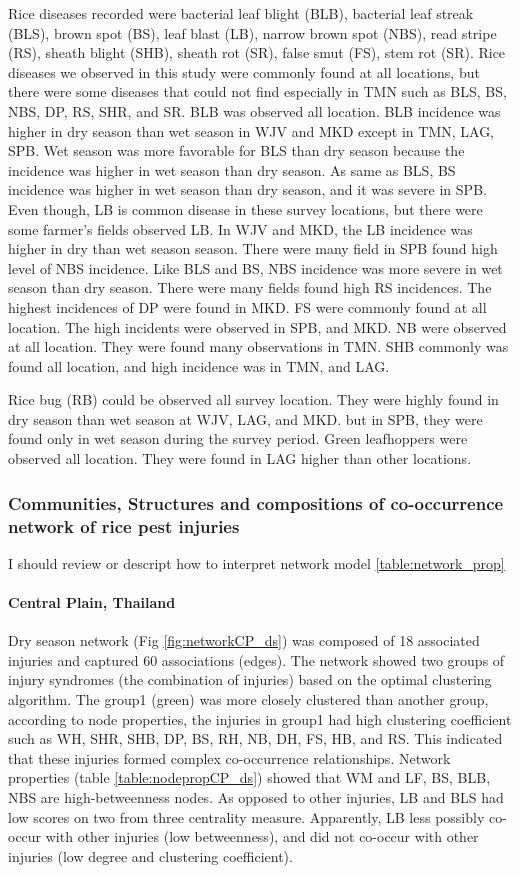 Rice diseases recorded were bacterial leaf blight (BLB), bacterial leaf streak (BLS), brown spot (BS), leaf blast (LB), narrow brown spot (NBS), read stripe (RS), sheath blight (SHB), sheath rot (SR), false smut (FS), stem rot (SR). Rice diseases we observed in this study were commonly found at all locations, but there were some diseases that could not find especially in TMN such as BLS, BS, NBS, DP, RS, SHR, and SR. BLB was observed all location. BLB incidence was higher in dry season than wet season in WJV and MKD except in TMN, LAG, SPB. Wet season was more favorable for BLS than dry season because the incidence was higher in wet season than dry season. As same as BLS, BS incidence was higher in wet season than dry season, and it was severe in SPB. Even though, LB is common disease in these survey locations, but there were some farmer’s fields observed LB. In WJV and MKD, the LB incidence was higher in dry than wet season season. There were many field in SPB found high level of NBS incidence. Like BLS and BS, NBS incidence was more severe in wet season than dry season. There were many fields found high RS incidences. The highest incidences of DP were found in MKD. FS were commonly found at all location. The high incidents were observed in SPB, and MKD. NB were observed at all location. They were found many observations in TMN.  SHB commonly was found all location, and high incidence was in TMN, and LAG. 

Rice bug (RB) could be observed all survey location. They were highly found in dry season than wet season at WJV, LAG, and MKD. but in SPB, they were found only in wet season during the survey period.  Green leafhoppers were observed all location. They were found in LAG higher than other locations.

\subsubsection{Communities, Structures and compositions of co-occurrence network of rice pest injuries}
I should review or descript how to interpret network model 
\ref{table:network_prop}
\paragraph{Central Plain, Thailand}

Dry season network (Fig \ref{fig:networkCP_ds}) was composed of 18 associated injuries and captured 60 associations (edges). The network showed two groups of injury syndromes (the combination of injuries) based on the optimal clustering algorithm. The group1 (green) was more closely clustered than another group, according to node properties, the injuries in group1 had high clustering coefficient such as WH, SHR, SHB, DP, BS, RH, NB, DH, FS, HB, and RS. This indicated that these injuries formed complex co-occurrence relationships. Network properties (table \ref{table:nodepropCP_ds}) showed that WM and LF, BS, BLB, NBS are high-betweenness nodes.  As opposed to other injuries, LB and BLS had low scores on two from three centrality measure. Apparently, LB less possibly co-occur with other injuries (low betweenness), and did not co-occur with other injuries (low degree and clustering coefficient).

